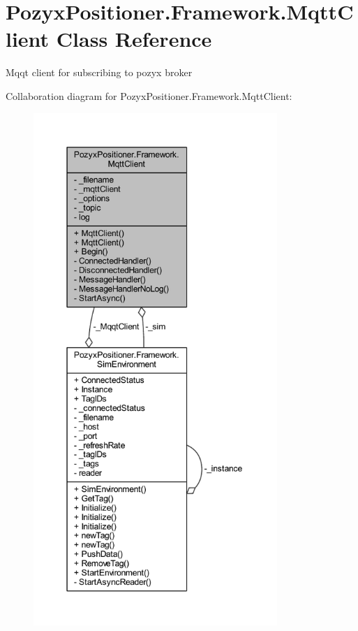 \hypertarget{class_pozyx_positioner_1_1_framework_1_1_mqtt_client}{}\section{Pozyx\+Positioner.\+Framework.\+Mqtt\+Client Class Reference}
\label{class_pozyx_positioner_1_1_framework_1_1_mqtt_client}


Mqqt client for subscribing to pozyx broker  




Collaboration diagram for Pozyx\+Positioner.\+Framework.\+Mqtt\+Client\+:\nopagebreak
\begin{figure}[H]
\begin{center}
\leavevmode
\includegraphics[height=550pt]{class_pozyx_positioner_1_1_framework_1_1_mqtt_client__coll__graph}
\end{center}
\end{figure}
